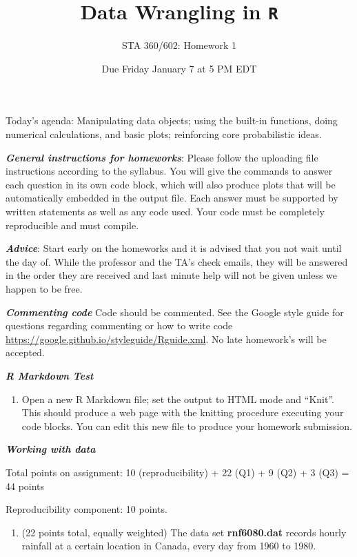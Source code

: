 \documentclass[
]{article}
\title{Data Wrangling in \texttt{R}}
\author{STA 360/602: Homework 1}
\date{Due Friday January 7 at 5 PM EDT}
\providecommand{\tightlist}{%
  \setlength{\itemsep}{0pt}\setlength{\parskip}{0pt}}
\begin{document}
\maketitle

Today's agenda: Manipulating data objects; using the built-in functions,
doing numerical calculations, and basic plots; reinforcing core
probabilistic ideas.

\textbf{\emph{General instructions for homeworks}}: Please follow the
uploading file instructions according to the syllabus. You will give the
commands to answer each question in its own code block, which will also
produce plots that will be automatically embedded in the output file.
Each answer must be supported by written statements as well as any code
used. Your code must be completely reproducible and must compile.

\textbf{\emph{Advice}}: Start early on the homeworks and it is advised
that you not wait until the day of. While the professor and the TA's
check emails, they will be answered in the order they are received and
last minute help will not be given unless we happen to be free.

\textbf{\emph{Commenting code}} Code should be commented. See the Google
style guide for questions regarding commenting or how to write code
\url{https://google.github.io/styleguide/Rguide.xml}. No late homework's
will be accepted.

\textbf{\emph{R Markdown Test}}

\begin{enumerate}
\def\labelenumi{\arabic{enumi}.}
\setcounter{enumi}{-1}
\tightlist
\item
  Open a new R Markdown file; set the output to HTML mode and ``Knit''.
  This should produce a web page with the knitting procedure executing
  your code blocks. You can edit this new file to produce your homework
  submission.
\end{enumerate}

\textbf{\emph{Working with data}}

Total points on assignment: 10 (reproducibility) + 22 (Q1) + 9 (Q2) + 3
(Q3) = 44 points

Reproducibility component: 10 points.

\begin{enumerate}
\def\labelenumi{\arabic{enumi}.}
\tightlist
\item
  (22 points total, equally weighted) The data set \textbf{rnf6080.dat}
  records hourly rainfall at a certain location in Canada, every day
  from 1960 to 1980.
\end{enumerate}
\end{document}
